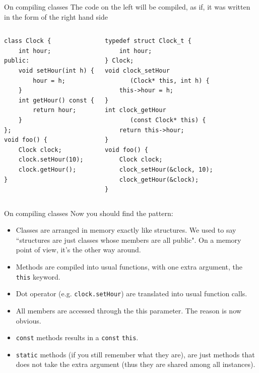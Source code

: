 \begin{frame}[fragile]{On compiling classes}
The code on the left will be compiled, as if, it was written in the form of the right hand side

\begin{columns}

\vspace{-.2in}
\begin{verbatim}
class Clock {
    int hour;
public:
    void setHour(int h) {
        hour = h;
    }
    int getHour() const {
        return hour;
    }
};
void foo() {
    Clock clock; 
    clock.setHour(10);
    clock.getHour(); 
}
\end{verbatim}

\vspace{-.2in}
\begin{verbatim}
typedef struct Clock_t {
    int hour; 
} Clock;
void clock_setHour
       (Clock* this, int h) {
    this->hour = h;
}
int clock_getHour
       (const Clock* this) {
    return this->hour;
}
void foo() {
    Clock clock; 
    clock_setHour(&clock, 10);
    clock_getHour(&clock); 
}
\end{verbatim}
\end{columns}
\end{frame}

\begin{frame}{On compiling classes}
Now you should find the pattern:
\begin{itemize}
	\item Classes are arranged in memory exactly like structures. We used to say ``structures are just classes whose members are all public". On a memory point of view, it's the other way around.
	\item \alert{Methods are compiled into usual functions}, with one extra argument, the \texttt{this} keyword.
	\item Dot operator (e.g. \texttt{clock.setHour}) are translated into usual function calls.
	\item All members are accessed through the this parameter. The reason is now obvious.
	\item \texttt{const} methods results in a \texttt{const} \texttt{this}.
	\item \texttt{static} methods (if you still remember what they are), are just methods that does not take the extra argument (thus they are shared among all instances).
\end{itemize}
\end{frame}

